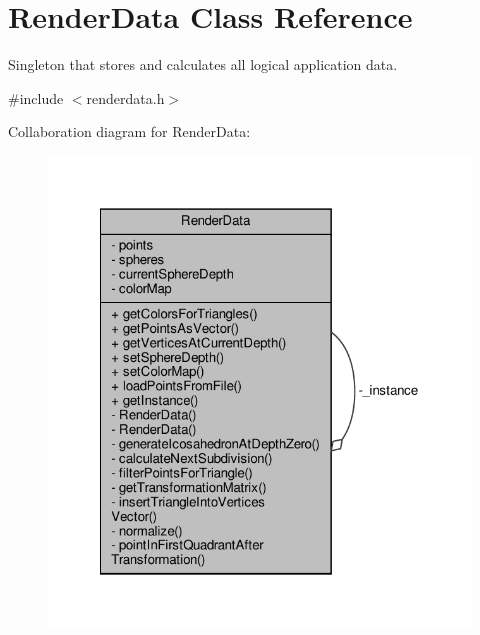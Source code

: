 \hypertarget{class_render_data}{}\section{Render\+Data Class Reference}
\label{class_render_data}


Singleton that stores and calculates all logical application data.  




{\ttfamily \#include $<$renderdata.\+h$>$}



Collaboration diagram for Render\+Data\+:
\nopagebreak
\begin{figure}[H]
\begin{center}
\leavevmode
\includegraphics[width=322pt]{class_render_data__coll__graph}
\end{center}
\end{figure}
